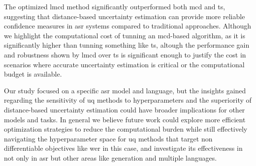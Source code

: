 \documentclass[11pt]{article}
\begin{document}
The optimized \acrshort{lmcd} method significantly outperformed both \acrshort{mcd} and \acrshort{ts}, suggesting that distance-based uncertainty estimation can provide more reliable confidence measures in \acrshort{asr} systems compared to traditional approaches. Although we highlight the computational cost of tunning an \acrshort{mcd}-based algorithm, as it is significantly higher than tunning something like \acrshort{ts}, altough the performance gain and robustness shown by \acrshort{lmcd} over \acrshort{ts} is significant enough to justify the cost in scenarios where accurate uncertainty estimation is critical or the computational budget is available.

Our study focused on a specific \acrshort{asr} model and language, but the insights gained regarding the sensitivity of \acrshort{uq} methods to hyperparameters and the superiority of distance-based uncertainty estimation could have broader implications for other models and tasks.
In general we believe future work could explore more efficient optimization strategies to reduce the computational burden while still effectively navigating the hyperparameter space for \acrshort{uq} methods that target non differentiable objectives like \acrshort{wer} in this case, and investigate its effectiveness in not only in \acrshort{asr} but other areas like generation and multiple languages.



\end{document}
